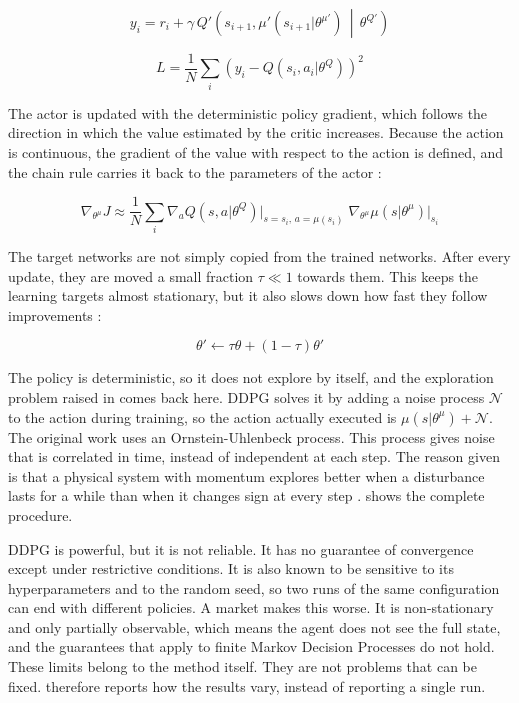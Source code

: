 \begin{equation}
y_i = r_i + \gamma \, Q'\!\left(s_{i+1}, \mu'(s_{i+1} | \theta^{\mu'}) \,\middle|\, \theta^{Q'}\right)
\label{Equation:DDPGTarget}
\end{equation}

\begin{equation}
L = \frac{1}{N} \sum_{i} \left( y_i - Q(s_i, a_i | \theta^{Q}) \right)^2
\label{Equation:DDPGCriticLoss}
\end{equation}

The actor is updated with the deterministic policy gradient, which follows the direction in which the value estimated by the critic increases. Because the action is continuous, the gradient of the value with respect to the action is defined, and the chain rule carries it back to the parameters of the actor \cite{lillicrap_continuous_2015}:

\begin{equation}
\nabla_{\theta^{\mu}} J \approx \frac{1}{N} \sum_{i} \nabla_{a} Q(s, a | \theta^{Q}) \big|_{s = s_i,\, a = \mu(s_i)} \; \nabla_{\theta^{\mu}} \mu(s | \theta^{\mu}) \big|_{s_i}
\label{Equation:DeterministicPolicyGradient}
\end{equation}

The target networks are not simply copied from the trained networks. After every update, they are moved a small fraction \( \tau \ll 1 \) towards them. This keeps the learning targets almost stationary, but it also slows down how fast they follow improvements \cite{lillicrap_continuous_2015}:

\begin{equation}
\theta' \leftarrow \tau \theta + (1 - \tau) \theta'
\label{Equation:SoftUpdate}
\end{equation}

The policy is deterministic, so it does not explore by itself, and the exploration problem raised in  comes back here. DDPG solves it by adding a noise process \( \mathcal{N} \) to the action during training, so the action actually executed is \( \mu(s | \theta^{\mu}) + \mathcal{N} \). The original work uses an Ornstein-Uhlenbeck process. This process gives noise that is correlated in time, instead of independent at each step. The reason given is that a physical system with momentum explores better when a disturbance lasts for a while than when it changes sign at every step \cite{lillicrap_continuous_2015}.  shows the complete procedure.



DDPG is powerful, but it is not reliable. It has no guarantee of convergence except under restrictive conditions. It is also known to be sensitive to its hyperparameters and to the random seed, so two runs of the same configuration can end with different policies. A market makes this worse. It is non-stationary and only partially observable, which means the agent does not see the full state, and the guarantees that apply to finite Markov Decision Processes do not hold. These limits belong to the method itself. They are not problems that can be fixed.  therefore reports how the results vary, instead of reporting a single run.